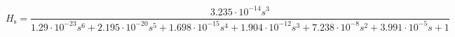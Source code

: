 \begin{equation}
H_{\mathrm{s}} = \frac{3.235 \cdot 10^{-14} s^{3}}{1.29 \cdot 10^{-23} s^{6} + 2.195 \cdot 10^{-20} s^{5} + 1.698 \cdot 10^{-15} s^{4} + 1.904 \cdot 10^{-12} s^{3} + 7.238 \cdot 10^{-8} s^{2} + 3.991 \cdot 10^{-5} s + 1}
\end{equation}

